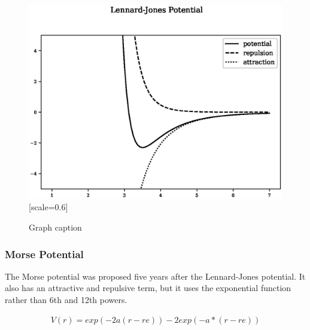 \begin{figure}[!htbp]
  \begin{center}
    \includegraphics[scale=0.70]{chapters/background_potential_fitting/plots/lennard_jones.eps}[scale=0.6]
    \caption{Graph caption}
    \label{graph:graph1}
  \end{center}
\end{figure}



\FloatBarrier
\subsubsection{Morse Potential}

The Morse potential was proposed five years after the Lennard-Jones potential.  It also has an attractive and repulsive term, but it uses the exponential function rather than 6th and 12th powers.

\begin{equation}
\begin{split}
V(r) = exp(-2 a (r - re)) - 2 exp (-a*(r - re))
\end{split}
\label{eq:eqLennardJones}
\end{equation}

